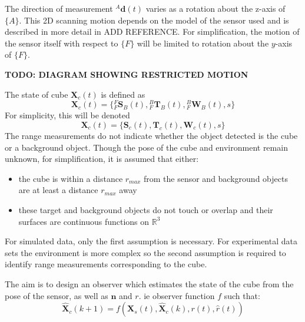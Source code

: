 The direction of measurement ${^{A}\mathbf{d}(t)}$ varies as a rotation about the z-axis of $\{A\}$. This 2D scanning motion depends on the model of the sensor used and is described in more detail in ADD REFERENCE. For simplification, the motion of the sensor itself with respect to $\{F\}$ will be limited to rotation about the $y$-axis of $\{F\}$.

\textbf{TODO: DIAGRAM SHOWING RESTRICTED MOTION}

The state of cube $\mathbf{X}_{c}(t)$ is defined as 
\begin{equation}
	\mathbf{X}_{c}(t) = 
	\{{^{F}_{F}\mathbf{S}^{}_{B}(t)},{^{B}_{F}\mathbf{T}^{}_{B}(t)},{^{B}_{F}\mathbf{W}^{}_{B}(t)},
	s\}
\end{equation}
For simplicity, this will be denoted
\begin{equation}
	\mathbf{X}_{c}(t) = 
	\{\mathbf{S}_{c}(t),\mathbf{T}_{c}(t),\mathbf{W}_{c}(t),s\}
\end{equation}
The range measurements do not indicate whether the object detected is the cube or a background object. Though the pose of the cube and environment remain unknown, for simplification, it is assumed that either:
\begin{itemize}
\item the cube is within a distance $r_{max}$ from the sensor and background objects are at least a distance $r_{max}$ away
\item these target and background objects do not touch or overlap and their surfaces are continuous functions on $\mathbb{R}^3$
\end{itemize}
For simulated data, only the first assumption is necessary. For experimental data sets the environment is more complex so the second assumption is required to identify range measurements corresponding to the cube. 

The aim is to design an observer which estimates the state of the cube from the pose of the sensor, as well as $\mathbf{n}$ and $r$. ie observer function $f$ such that:
\begin{equation}
	\hat{\mathbf{X}}_{c}(k+1) = f(\mathbf{X}_{s}(t),\hat{\mathbf{X}}_{c}(k),r(t),\hat{r}(t))
\end{equation}

